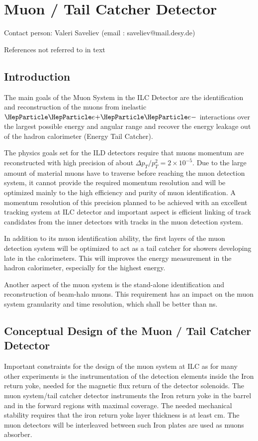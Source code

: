 \section{Muon / Tail Catcher Detector}
Contact person: Valeri Saveliev (email : saveliev@mail.desy.de)

{\color{red} References not referred to in text}

\subsection{Introduction}
The main goals of the Muon System in the ILC Detector are the identification and reconstruction of the muons from inelastic $\Pep\Pem$ interactions over the largest possible energy and angular range and recover the energy leakage out of the hadron calorimeter (Energy Tail Catcher).

The physics goals set for the ILD detectors require that muons momentum are reconstructed with high precision of about $\Delta p_T/p^2_T = 2 \times10^{-5}$.
Due to the large amount of material muons have to traverse before reaching the muon detection system,  it cannot provide the required  momentum resolution and will be optimized mainly to the high efficiency and purity of muon identification.
A momentum resolution of this precision planned to be achieved with an excellent tracking system at ILC detector and important aspect is efficient linking of track candidates from the inner detectors with tracks in the muon detection system.

In addition to its muon identification ability, the first layers of the muon detection system will be optimized to act as a tail catcher for showers developing late in the calorimeters. This will improves the energy measurement in the hadron calorimeter, especially for the highest energy.

Another aspect of the muon system is the stand-alone identification and reconstruction of beam-halo muons. This requirement has an impact on the muon system granularity and time resolution, which shall be better than \unit[1]{ns}.

\subsection{Conceptual Design of the Muon / Tail Catcher Detector}
Important constraints for the design of the muon system at ILC  as for many other experiments is the instrumentation of the detection elements inside the Iron return yoke, needed for the magnetic flux return of the detector solenoids.
The muon system/tail catcher detector instruments the Iron return yoke in the barrel and in the forward regions with maximal coverage.
The needed mechanical stability requires that the iron return yoke layer thickness is at least \unit[10]{cm}.
The muon detectors will be interleaved between such Iron plates are used as muons absorber.

